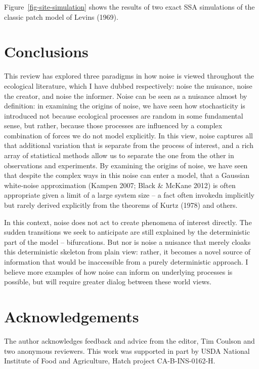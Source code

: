 \documentclass[
  authoryear,
  preprint]{elsarticle}
\begin{document}
Figure~\ref{fig-site-simulation} shows the results of two exact SSA
simulations of the classic patch model of Levins (1969).

\section{Conclusions}\label{conclusions}

This review has explored three paradigms in how noise is viewed
throughout the ecological literature, which I have dubbed respectively:
noise the nuisance, noise the creator, and noise the informer. Noise can
be seen as a nuisance almost by definition: in examining the origins of
noise, we have seen how stochasticity is introduced not because
ecological processes are random in some fundamental sense, but rather,
because those processes are influenced by a complex combination of
forces we do not model explicitly. In this view, noise captures all that
additional variation that is separate from the process of interest, and
a rich array of statistical methods allow us to separate the one from
the other in observations and experiments. By examining the origins of
noise, we have seen that despite the complex ways in this noise can
enter a model, that a Gaussian white-noise approximation (Kampen 2007;
Black \& McKane 2012) is often appropriate given a limit of a large
system size -- a fact often invokedn implicitly but rarely derived
explicitly from the theorems of Kurtz (1978) and others.

In this context, noise does not act to create phenomena of interest
directly. The sudden transitions we seek to anticipate are still
explained by the deterministic part of the model -- bifurcations. But
nor is noise a nuisance that merely cloaks this deterministic skeleton
from plain view: rather, it becomes a novel source of information that
would be inaccessible from a purely deterministic approach. I believe
more examples of how noise can inform on underlying processes is
possible, but will require greater dialog between these world views.

\section{Acknowledgements}\label{acknowledgements}

The author acknowledges feedback and advice from the editor, Tim Coulson
and two anonymous reviewers. This work was supported in part by USDA
National Institute of Food and Agriculture, Hatch project
CA-B-INS-0162-H.


\renewcommand\refname{References}
  
\end{document}
